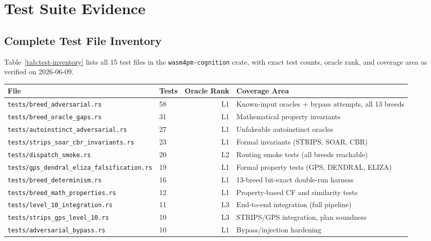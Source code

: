 \appendix
\chapter{Test Suite Evidence}
\label{app:test-suite-evidence}

\section{Complete Test File Inventory}
\label{app:test-inventory}

Table~\ref{tab:test-inventory} lists all 15 test files in the \texttt{wasm4pm-cognition} crate,
with exact test counts, oracle rank, and coverage area as verified on 2026-06-09.

\begin{table}[ht]
\centering
\small
\begin{tabular}{llrl}
\hline
\textbf{File} & \textbf{Tests} & \textbf{Oracle Rank} & \textbf{Coverage Area} \\
\hline
\texttt{tests/breed\_adversarial.rs}             & 58 & L1 & Known-input oracles + bypass attempts, all 13 breeds \\
\texttt{tests/breed\_oracle\_gaps.rs}            & 31 & L1 & Mathematical property invariants \\
\texttt{tests/autoinstinct\_adversarial.rs}      & 27 & L1 & Unfakeable autoinstinct oracles \\
\texttt{tests/strips\_soar\_cbr\_invariants.rs}  & 23 & L1 & Formal invariants (STRIPS, SOAR, CBR) \\
\texttt{tests/dispatch\_smoke.rs}                & 20 & L2 & Routing smoke tests (all breeds reachable) \\
\texttt{tests/gps\_dendral\_eliza\_falsification.rs} & 19 & L1 & Formal property tests (GPS, DENDRAL, ELIZA) \\
\texttt{tests/breed\_determinism.rs}             & 16 & L1 & 13-breed bit-exact double-run harness \\
\texttt{tests/breed\_math\_properties.rs}        & 12 & L1 & Property-based CF and similarity tests \\
\texttt{tests/level\_10\_integration.rs}         & 11 & L3 & End-to-end integration (full pipeline) \\
\texttt{tests/strips\_gps\_level\_10.rs}         & 10 & L3 & STRIPS/GPS integration, plan soundness \\
\texttt{tests/adversarial\_bypass.rs}            & 10 & L1 & Bypass/injection hardening \\

\end{tabular}
\end{table}
